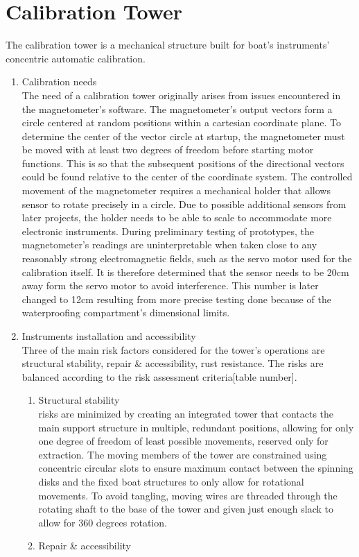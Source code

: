 \documentclass{article}[10pt]
\begin{document}
\section{Calibration Tower}
The calibration tower is a mechanical structure built for boat's instruments' concentric automatic calibration.  
\begin{enumerate}
    \item Calibration needs\\
The need of a calibration tower originally arises from issues encountered in the magnetometer's software. The magnetometer’s output vectors form a circle centered at random positions within a cartesian coordinate plane. To determine the center of the vector circle at startup, the magnetometer must be moved with at least two degrees of freedom before starting motor functions. This is so that the subsequent positions of the directional vectors could be found relative to the center of the coordinate system. The controlled movement of the magnetometer requires a mechanical holder that allows sensor to rotate precisely in a circle. Due to possible additional sensors from later projects, the holder needs to be able to scale to accommodate more electronic instruments.
During preliminary testing of prototypes, the magnetometer’s readings are uninterpretable when taken close to any reasonably strong electromagnetic fields, such as the servo motor used for the calibration itself. It is therefore determined that the sensor needs to be 20cm away form the servo motor to avoid interference. This number is later changed to 12cm resulting from more precise testing done because of the waterproofing compartment’s dimensional limits.

    \item Instruments installation and accessibility\\
    Three of the main risk factors considered for the tower’s operations are structural stability, repair \& accessibility, rust resistance. The risks are balanced according to the risk assessment criteria[table number].
    \begin{enumerate}
        \item Structural stability \\
risks are minimized by creating an integrated tower that contacts the main support structure in multiple, redundant positions, allowing for only one degree of freedom of least possible movements, reserved only for extraction. 
The moving members of the tower are constrained using concentric circular slots to ensure maximum contact between the spinning disks and the fixed boat structures to only allow for rotational movements. To avoid tangling, moving wires are threaded through the rotating shaft to the base of the tower and given just enough slack to allow for 360 degrees rotation.
\item Repair \& accessibility
    

\end{enumerate}
\end{enumerate}
\end{document}
